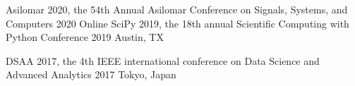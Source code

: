 

\begin{cvconfs}
  \cvconf
    {Asilomar 2020, the 54th Annual Asilomar Conference on Signals, Systems, and Computers} %
    {2020} %
    {Online} %
    {}
  \cvconf
    {SciPy 2019, the 18th annual Scientific Computing with Python Conference} %
    {2019} %
    {Austin, TX} %
    {}

  \cvconf
    {DSAA 2017, the 4th IEEE international conference on Data Science and Advanced Analytics} %
    {2017} %
    {Tokyo, Japan} %
    {}
\end{cvconfs}

